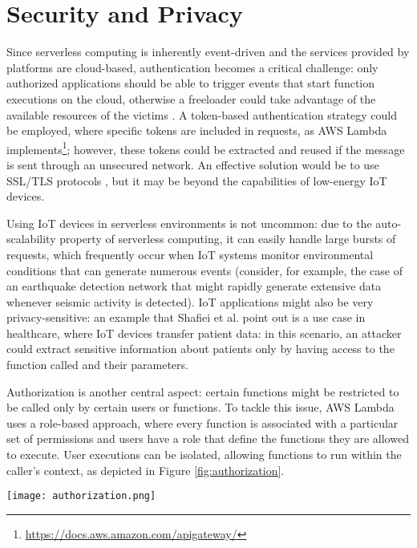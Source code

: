 \documentclass[
	a4paper, %
	12pt,
	twoside, %
]{LTJournalArticle}
\begin{document}
\section{Security and Privacy}
Since serverless computing is inherently event-driven and the services provided by platforms are cloud-based, authentication becomes a critical challenge: only authorized applications should be able to trigger events that start function executions on the cloud, otherwise a freeloader could take advantage of the available resources of the victims \cite{shafiei_serverless_2022}. A token-based authentication strategy could be employed, where specific tokens are included in requests, as AWS Lambda implements\footnote{\url{https://docs.aws.amazon.com/apigateway/}}; however, these tokens could be extracted and reused if the message is sent through an unsecured network. 
An effective solution would be to use SSL/TLS protocols \cite{freier_secure_2011, rescorla_transport_2018}, but it may be beyond the capabilities of low-energy IoT devices.

Using IoT devices in serverless environments is not uncommon: due to the auto-scalability property of serverless computing, it can easily handle large bursts of requests, which frequently occur when IoT systems monitor environmental conditions that can generate numerous events (consider, for example, the case of an earthquake detection network that might rapidly generate extensive data whenever seismic activity is detected). IoT applications might also be very privacy-sensitive: an example that Shafiei et al. \cite{shafiei_serverless_2022} point out is a use case in healthcare, where IoT devices transfer patient data: in this scenario, an attacker could extract sensitive information about patients only by having access to the function called and their parameters. 

Authorization is another central aspect: certain functions might be restricted to be called only by certain users or functions. To tackle this issue, AWS Lambda uses a role-based approach, where every function is associated with a particular set of permissions and users have a role that define the functions they are allowed to execute. User executions can be isolated, allowing functions to run within the caller's context, as depicted in Figure \ref{fig:authorization}. 
\begin{figure*}[!htb]
	\texttt{[image: authorization.png]}
	\caption{Authorization and isolated execution in serverless. Source: \cite{castro_rise_2019}}
	\label{fig:authorization}
\end{figure*}
\end{document}
